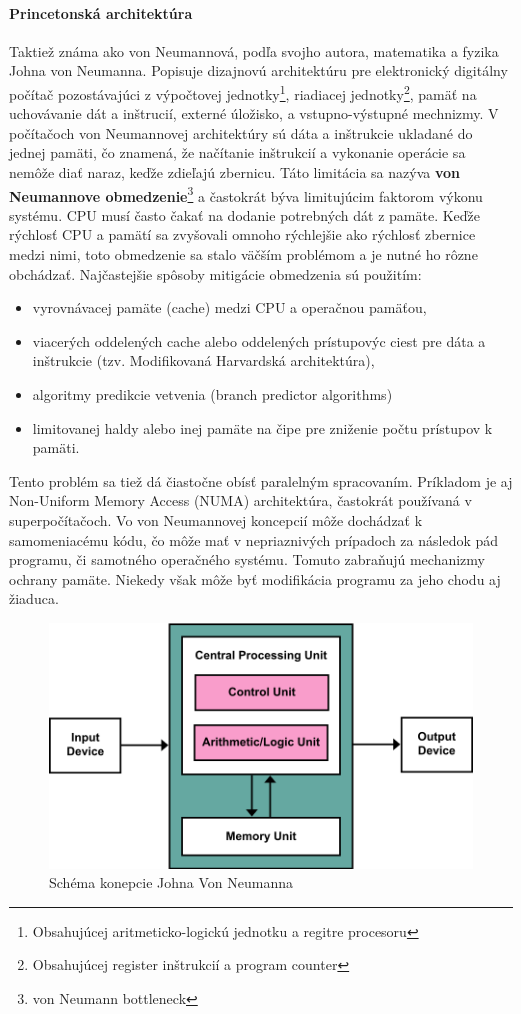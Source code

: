 \documentclass[11pt,a4paper]{report}
\begin{document}
\paragraph{Princetonská architektúra} Taktiež známa ako von Neumannová, podľa svojho autora, matematika a fyzika Johna von Neumanna. Popisuje dizajnovú architektúru pre elektronický digitálny počítač pozostávajúci z výpočtovej jednotky\footnote{Obsahujúcej aritmeticko-logickú jednotku a regitre procesoru}, riadiacej jednotky\footnote{Obsahujúcej register inštrukcií a program counter}, pamäť na uchovávanie dát a inštrucií, externé úložisko, a vstupno-výstupné mechnizmy. V počítačoch von Neumannovej architektúry sú dáta a inštrukcie ukladané do jednej pamäti, čo znamená, že načítanie inštrukcií a vykonanie operácie sa nemôže diať naraz, keďže zdieľajú zbernicu. Táto limitácia sa nazýva \textbf{von Neumannove obmedzenie}\footnote{von Neumann bottleneck} a častokrát býva limitujúcim faktorom výkonu systému. CPU musí často čakať na dodanie potrebných dát z pamäte. Keďže rýchlosť CPU a pamätí sa zvyšovali omnoho rýchlejšie ako rýchlosť zbernice medzi nimi, toto obmedzenie sa stalo väčším problémom a je nutné ho rôzne obchádzať. Najčastejšie spôsoby mitigácie obmedzenia sú použitím:
\begin{itemize}
\item vyrovnávacej pamäte (cache) medzi CPU a operačnou pamäťou,
\item viacerých oddelených cache alebo oddelených prístupovýc ciest pre dáta a inštrukcie (tzv. Modifikovaná Harvardská architektúra),
\item algoritmy predikcie vetvenia (branch predictor algorithms)
\item limitovanej haldy alebo inej pamäte na čipe pre zniženie počtu prístupov k pamäti.
\end{itemize} 

Tento problém sa tiež dá čiastočne obísť paralelným spracovaním. Príkladom je aj Non-Uniform Memory Access (NUMA) architektúra, častokrát používaná v superpočítačoch. Vo von Neumannovej koncepcií môže dochádzať k samomeniacému kódu, čo môže mať v nepriaznivých prípadoch za následok pád programu, či samotného operačného systému. Tomuto zabraňujú mechanizmy ochrany pamäte. Niekedy však môže byť modifikácia programu za jeho chodu aj žiaduca.

\begin{figure}[ht]
        \centering
        \includegraphics[scale=0.6]{images/Von_Neumann_Architecture}
        \caption{Schéma konepcie Johna Von Neumanna}
        \label{Neumann:}
\end{figure}
\newpage
\end{document}

